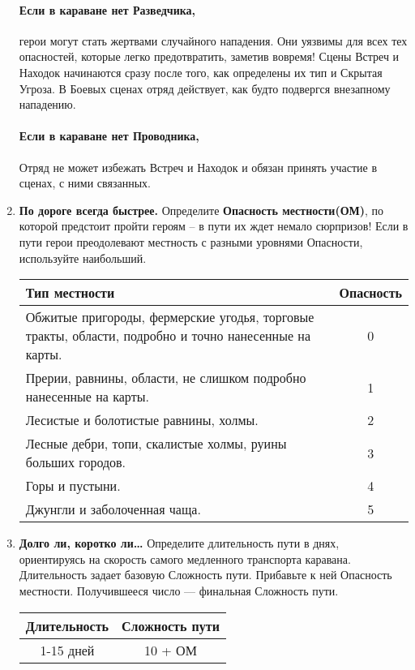\begin{enumerate}
\paragraph{Если в караване нет Разведчика,} герои могут стать жертвами случайного нападения. Они уязвимы для всех тех опасностей, которые легко предотвратить, заметив вовремя! Сцены Встреч и Находок начинаются сразу после того, как определены их тип и Скрытая Угроза. В Боевых сценах отряд действует, как будто подвергся внезапному нападению.
\paragraph{Если в караване нет Проводника,} Отряд не может избежать Встреч и Находок и обязан принять участие в сценах, с ними связанных.
\item \textbf{По дороге всегда быстрее.} Определите \textbf{Опасность местности(ОМ)}, по которой предстоит пройти героям – в пути их ждет немало сюрпризов! Если в пути герои преодолевают местность с разными уровнями Опасности, используйте наибольший.
\begin{center}
\begin{tabular}{|p{10cm}|c|}
\hline
Тип местности & Опасность \\ \hline
Обжитые пригороды, фермерские угодья, торговые тракты, области, подробно и точно нанесенные на карты. & 0 \\ \hline
Прерии, равнины, области, не слишком подробно нанесенные на карты. & 1 \\ \hline
Лесистые и болотистые равнины, холмы. & 2 \\ \hline
Лесные дебри, топи, скалистые холмы, руины больших городов. & 3 \\ \hline
Горы и пустыни. & 4 \\ \hline
Джунгли и заболоченная чаща. & 5 \\ \hline
\end{tabular}
\end{center}
\item \textbf{Долго ли, коротко ли…} Определите длительность пути в днях, ориентируясь на скорость самого медленного транспорта каравана. Длительность задает базовую Сложность пути. Прибавьте к ней Опасность местности. Получившееся число — финальная Сложность пути.
\begin{center}
\begin{tabular}{|c|c|}
\hline
Длительность & Сложность пути \\ \hline
1-15 дней & 10 + ОМ \\ \hline

\end{tabular}
\end{center}
\end{enumerate}
